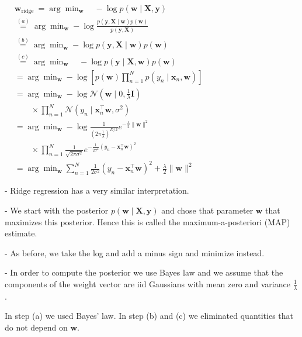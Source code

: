 $
\begin{aligned}
& \mathbf{w}_{\text {ridge }}=\arg \min _{\mathbf{w}} \quad-\log p(\mathbf{w} \mid \mathbf{X}, \mathbf{y}) \\
& \stackrel{(a)}{=} \arg \min _{\mathbf{w}}-\log \frac{p(\mathbf{y}, \mathbf{X} \mid \mathbf{w}) p(\mathbf{w})}{p(\mathbf{y}, \mathbf{X})} \\
& \stackrel{(b)}{=} \arg \min _{\mathbf{w}}-\log p(\mathbf{y}, \mathbf{X} \mid \mathbf{w}) p(\mathbf{w}) \\
& \stackrel{(c)}{=} \arg \min _{\mathbf{w}} \quad-\log p(\mathbf{y} \mid \mathbf{X}, \mathbf{w}) p(\mathbf{w}) \\
& =\arg \min _{\mathbf{w}}-\log \left[p(\mathbf{w}) \prod_{n=1}^{N} p\left(y_{n} \mid \mathbf{x}_{n}, \mathbf{w}\right)\right] \\
& =\arg \min _{\mathbf{w}}-\log \mathcal{N}\left(\mathbf{w} \mid 0, \frac{1}{\lambda} \mathbf{I}\right) 
\\ & \qquad \times \prod_{n=1}^{N} \mathcal{N}\left(y_{n} \mid \mathbf{x}_{n}^{\top} \mathbf{w}, \sigma^{2}\right) \\
& =\arg \min _{\mathbf{w}}-\log \frac{1}{\left(2 \pi \frac{1}{\lambda}\right)^{D / 2}} e^{-\frac{\lambda}{2}\|\mathbf{w}\|^{2}} 
\\ & \qquad \times
\prod_{n=1}^{N} \frac{1}{\sqrt{2 \pi \sigma^{2}}} e^{-\frac{1}{2 \sigma^{2}}\left(y_{n}-\mathbf{x}_{n}^{\top} \mathbf{w}\right)^{2}}
\\
& =\arg \min _{\mathbf{w}} \sum_{n=1}^{N} \frac{1}{2 \sigma^{2}}\left(y_{n}-\mathbf{x}_{n}^{\top} \mathbf{w}\right)^{2}+\frac{\lambda}{2}\|\mathbf{w}\|^{2}
\end{aligned}
$

- Ridge regression has a very similar interpretation. 

- We start with the posterior $p(\mathbf{w} \mid \mathbf{X}, \mathbf{y})$ and chose that parameter $\mathbf{w}$ that maximizes this posterior. Hence this is called the maximum-a-posteriori (MAP) estimate. 

- As before, we take the log and add a minus sign and minimize instead. 

- In order to compute the posterior we use Bayes law and we assume that the components of the weight vector are iid Gaussians with mean zero and variance $\frac{1}{\lambda}$.

In step (a) we used Bayes' law. In step (b) and (c) we eliminated quantities that do not depend on $\mathbf{w}$.

